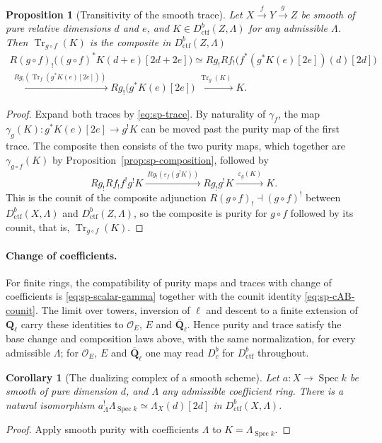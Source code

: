 \documentclass[11pt,a4paper]{article}
\numberwithin{equation}{section}
\newtheorem{proposition}[theorem]{Proposition}
\newtheorem{corollary}[theorem]{Corollary}
\theoremstyle{definition}
\theoremstyle{remark}
\newcommand{\Dbc}{D^b_c}
\newcommand{\Qbar}{\overline{\mathbf Q}_\ell}
\newcommand{\Ql}{\mathbf Q_\ell}
\newcommand{\Dctf}{D^b_{\mathrm{ctf}}}
\begin{document}
\begin{proposition}[Transitivity of the smooth trace]
\label{prop:sp-trace-composition}
Let $X\xrightarrow{f}Y\xrightarrow{g}Z$ be smooth of pure relative
dimensions $d$ and $e$, and $K\in\Dctf(Z,\Lambda)$ for any admissible
$\Lambda$. Then
$\operatorname{Tr}_{g\circ f}(K)$ is the composite in $\Dctf(Z,\Lambda)$
\[
\begin{gathered}
 R(g\circ f)_!
       \bigl((g\circ f)^{*}K(d+e)[2d+2e]\bigr)
 \simeq Rg_!Rf_!
   \bigl(f^{*}
     (g^{*}K(e)[2e])(d)[2d]\bigr)\\
 \xrightarrow{\ Rg_!
   (\operatorname{Tr}_{f}(g^{*}K(e)[2e]))\ }
 Rg_!\bigl(g^{*}K(e)[2e]\bigr)
 \xrightarrow{\ \operatorname{Tr}_{g}(K)\ }K.
\end{gathered}
\]
\end{proposition}
\begin{proof}
Expand both traces by \eqref{eq:sp-trace}. By naturality of $\gamma_f$,
the map $\gamma_g(K):g^{*}K(e)[2e]\to g^!K$ can be moved
past the purity map of the first trace. The composite then consists of
the two purity maps, which together are $\gamma_{g\circ f}(K)$ by
Proposition~\ref{prop:sp-composition}, followed by
\[
 Rg_!Rf_!f^!g^!K
 \xrightarrow{\ Rg_!(\varepsilon_{f}(g^!K))\ }
 Rg_!g^!K
 \xrightarrow{\ \varepsilon_{g}(K)\ }K.
\]
This is the counit of the composite adjunction
$R(g\circ f)_!\dashv(g\circ f)^!$ between $\Dctf(X,\Lambda)$ and
$\Dctf(Z,\Lambda)$, so the composite is purity for
$g\circ f$ followed by its counit, that is,
$\operatorname{Tr}_{g\circ f}(K)$.
\end{proof}

\paragraph{Change of coefficients.}
For finite rings, the compatibility of purity maps and traces with
change of coefficients is \eqref{eq:sp-scalar-gamma} together with the
counit identity \eqref{eq:sp-cAB-counit}. The limit over towers,
inversion of $\ell$ and descent to a finite extension of $\Ql$ carry
these identities to $\mathcal O_E$, $E$ and $\Qbar$. Hence purity and
trace satisfy the base change and composition laws above, with the same
normalization, for every admissible $\Lambda$; for $\mathcal O_E$, $E$
and $\Qbar$ one may read $\Dbc$ for $\Dctf$ throughout.

\begin{corollary}[The dualizing complex of a smooth scheme]
\label{cor:sp-all-coefficients}
Let $a:X\to\operatorname{Spec}k$ be smooth of pure dimension $d$, and
$\Lambda$ any admissible coefficient ring. There is a natural isomorphism
$a_\Lambda^!\Lambda_{\operatorname{Spec}k}\simeq\Lambda_X(d)[2d]$ in
$\Dctf(X,\Lambda)$.
\end{corollary}
\begin{proof}
Apply smooth purity with coefficients $\Lambda$ to
$K=\Lambda_{\operatorname{Spec}k}$.
\end{proof}
\end{document}
